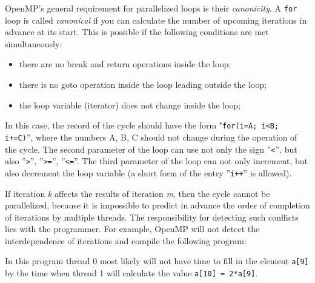 {OpenMP's general requirement for parallelized loops is their \textit {canonicity}. A \texttt{for} loop is called \textit {canonical} if you can calculate the number of upcoming iterations in advance at its start. This is possible if the following conditions are met simultaneously:
	\begin{itemize}
		\item there are no break and return operations inside the loop;
		\item there is no goto operation inside the loop leading outside the loop;
		\item the loop variable (iterator) does not change inside the loop;
	\end{itemize}
In this case, the record of the cycle should have the form "\texttt{for(i=A; i<B; i+=C)}'', where the numbers A, B, C should not change during the operation of the cycle. The second parameter of the loop can use not only the sign ''\texttt{<}'', but also ''\texttt{>}'', ''\texttt{>=}'', ''\texttt{<=}''. The third parameter of the loop can not only increment, but also decrement the loop variable (a short form of the entry  ''\texttt{i++}'' is allowed).
	\par If iteration \textit{k} affects the results of iteration \textit{m}, then the cycle cannot be parallelized, because it is impossible to predict in advance the order of completion of iterations by multiple threads. The responsibility for detecting such conflicts lies with the programmer. For example, OpenMP will not detect the interdependence of iterations and compile the following program:
	\begin{figure}[H]
		
	\end{figure}
	\par In this program thread 0 most likely will not have time to fill in the element \texttt{a[9]} by the time when thread 1 will calculate the value \texttt{a[10] = 2*a[9]}.
	\par
}